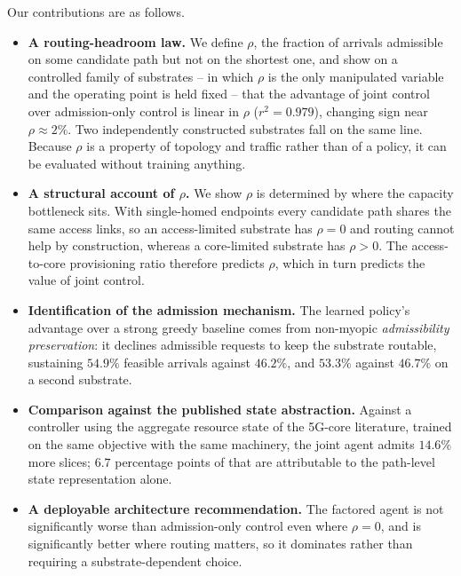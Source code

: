 \documentclass[10pt,journal,comsoc]{IEEEtran}
\begin{document}
Our contributions are as follows.
\begin{itemize}
  \item \textbf{A routing-headroom law.} We define $\rho$, the fraction of
  arrivals admissible on some candidate path but not on the shortest one,
  and show on a controlled family of substrates -- in which $\rho$ is the
  only manipulated variable and the operating point is held fixed -- that
  the advantage of joint control over admission-only control is linear in
  $\rho$ ($r^2=0.979$), changing sign near $\rho\approx2\%$. Two
  independently constructed substrates fall on the same line. Because
  $\rho$ is a property of topology and traffic rather than of a policy, it
  can be evaluated without training anything.
  \item \textbf{A structural account of $\rho$.} We show $\rho$ is
  determined by where the capacity bottleneck sits. With single-homed
  endpoints every candidate path shares the same access links, so an
  access-limited substrate has $\rho=0$ and routing cannot help by
  construction, whereas a core-limited substrate has $\rho>0$. The
  access-to-core provisioning ratio therefore predicts $\rho$, which in
  turn predicts the value of joint control.
  \item \textbf{Identification of the admission mechanism.} The learned
  policy's advantage over a strong greedy baseline comes from non-myopic
  \emph{admissibility preservation}: it declines admissible requests to
  keep the substrate routable, sustaining $54.9\%$ feasible arrivals
  against $46.2\%$, and $53.3\%$ against $46.7\%$ on a second substrate.
  \item \textbf{Comparison against the published state abstraction.}
  Against a controller using the aggregate resource state of the 5G-core
  literature, trained on the same objective with the same machinery, the
  joint agent admits $14.6\%$ more slices; $6.7$ percentage points of that
  are attributable to the path-level state representation alone.
  \item \textbf{A deployable architecture recommendation.} The factored
  agent is not significantly worse than admission-only control even where
  $\rho=0$, and is significantly better where routing matters, so it
  dominates rather than requiring a substrate-dependent choice.
\end{itemize}
\end{document}
